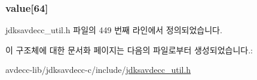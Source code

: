 \subsubsection[{\texorpdfstring{value}{value}}]{ value\mbox{[}64\mbox{]}}\hypertarget{structjdksavdecc__string_a7968db9d35aabae83b5c038723160e28}{}\label{structjdksavdecc__string_a7968db9d35aabae83b5c038723160e28}


jdksavdecc\+\_\+util.\+h 파일의 449 번째 라인에서 정의되었습니다.



이 구조체에 대한 문서화 페이지는 다음의 파일로부터 생성되었습니다.\+:\begin{DoxyCompactItemize}
\item 
avdecc-\/lib/jdksavdecc-\/c/include/\hyperlink{jdksavdecc__util_8h}{jdksavdecc\+\_\+util.\+h}\end{DoxyCompactItemize}
